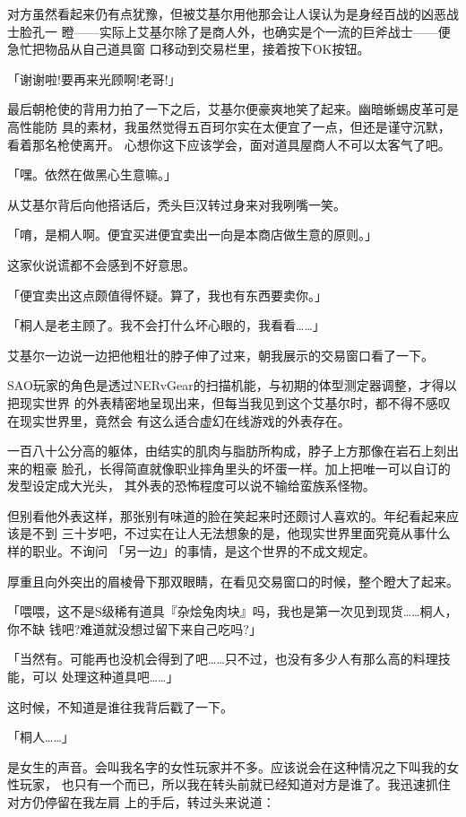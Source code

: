 \documentclass[11pt]{book}
\begin{document}
对方虽然看起来仍有点犹豫，但被艾基尔用他那会让人误认为是身经百战的凶恶战士脸孔一
瞪——实际上艾基尔除了是商人外，也确实是个一流的巨斧战士——便急忙把物品从自己道具窗
口移动到交易栏里，接着按下OK按钮。

「谢谢啦!要再来光顾啊!老哥!」

最后朝枪使的背用力拍了一下之后，艾基尔便豪爽地笑了起来。幽暗蜥蜴皮革可是高性能防
具的素材，我虽然觉得五百珂尔实在太便宜了一点，但还是谨守沉默，看着那名枪使离开。
心想你这下应该学会，面对道具屋商人不可以太客气了吧。

「嘿。依然在做黑心生意嘛。」

从艾基尔背后向他搭话后，秃头巨汉转过身来对我咧嘴一笑。

「唷，是桐人啊。便宜买进便宜卖出一向是本商店做生意的原则。」

这家伙说谎都不会感到不好意思。

「便宜卖出这点颇值得怀疑。算了，我也有东西要卖你。」

「桐人是老主顾了。我不会打什么坏心眼的，我看看……」

艾基尔一边说一边把他粗壮的脖子伸了过来，朝我展示的交易窗口看了一下。

SAO玩家的角色是透过NERvGear的扫描机能，与初期的体型测定器调整，才得以把现实世界
的外表精密地呈现出来，但每当我见到这个艾基尔时，都不得不感叹在现实世界里，竟然会
有这么适合虚幻在线游戏的外表存在。

一百八十公分高的躯体，由结实的肌肉与脂肪所构成，脖子上方那像在岩石上刻出来的粗豪
脸孔，长得简直就像职业摔角里头的坏蛋一样。加上把唯一可以自订的发型设定成大光头，
其外表的恐怖程度可以说不输给蛮族系怪物。

但别看他外表这样，那张别有味道的脸在笑起来时还颇讨人喜欢的。年纪看起来应该是不到
三十岁吧，不过实在让人无法想象的是，他现实世界里面究竟从事什么样的职业。不询问
「另一边」的事情，是这个世界的不成文规定。

厚重且向外突出的眉棱骨下那双眼睛，在看见交易窗口的时候，整个瞪大了起来。

「喂喂，这不是S级稀有道具『杂烩兔肉块』吗，我也是第一次见到现货……桐人，你不缺
钱吧?难道就没想过留下来自己吃吗?」

「当然有。可能再也没机会得到了吧……只不过，也没有多少人有那么高的料理技能，可以
处理这种道具吧……」

这时候，不知道是谁往我背后戳了一下。

「桐人……」

是女生的声音。会叫我名字的女性玩家并不多。应该说会在这种情况之下叫我的女性玩家，
也只有一个而已，所以我在转头前就已经知道对方是谁了。我迅速抓住对方仍停留在我左肩
上的手后，转过头来说道：
\end{document}
